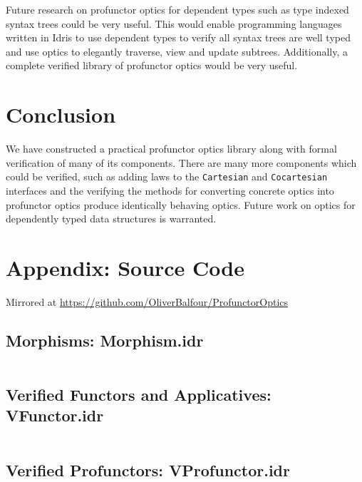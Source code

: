 \documentclass[11pt]{report}
\begin{document}
\begin{spacing}{1.15}
Future research on profunctor optics for dependent types such as type indexed syntax trees could be very useful. This would enable programming languages written in Idris to use dependent types to verify all syntax trees are well typed and use optics to elegantly traverse, view and update subtrees. Additionally, a complete verified library of profunctor optics would be very useful.

\section{Conclusion}

We have constructed a practical profunctor optics library along with formal verification of many of its components. There are many more components which could be verified, such as adding laws to the \texttt{Cartesian} and \texttt{Cocartesian} interfaces and the verifying the methods for converting concrete optics into profunctor optics produce identically behaving optics. Future work on optics for dependently typed data structures is warranted.

\printbibliography

\newpage
\section{Appendix: Source Code}

Mirrored at \href{https://github.com/OliverBalfour/ProfunctorOptics}{https://github.com/OliverBalfour/ProfunctorOptics}

\end{spacing}

\subsection{Morphisms: Morphism.idr}

\inputminted[breaklines,linenos]{idris}{../src/Category/Morphism.idr}

\subsection{Verified Functors and Applicatives: VFunctor.idr}

\inputminted[breaklines,linenos]{idris}{../src/Category/VFunctor.idr}

\subsection{Verified Profunctors: VProfunctor.idr}
\end{document}
